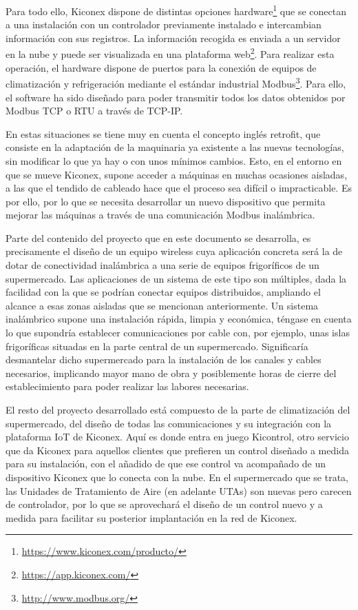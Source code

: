 Para todo ello, Kiconex dispone de distintas opciones hardware\footnote{\url{https://www.kiconex.com/producto/}} que se conectan a una instalación con un controlador previamente instalado e intercambian información con sus registros. La información recogida es enviada a un servidor en la nube y puede ser visualizada en una plataforma web\footnote{\url{https://app.kiconex.com/}}. Para realizar esta operación, el hardware dispone de puertos para la conexión de equipos de climatización y refrigeración mediante el estándar industrial Modbus\footnote{\url{http://www.modbus.org/}}. Para ello, el software ha sido diseñado para poder transmitir todos los datos obtenidos por Modbus TCP o RTU a través de TCP-IP.

En estas situaciones se tiene muy en cuenta el concepto inglés retrofit, que consiste en la adaptación de la maquinaria ya existente a las nuevas tecnologías, sin modificar lo que ya hay o con unos mínimos cambios. Esto, en el entorno en que se mueve Kiconex, supone acceder a máquinas en muchas ocasiones aisladas, a las que el tendido de cableado hace que el proceso sea difícil o impracticable. Es por ello, por lo que se necesita desarrollar un nuevo dispositivo que permita mejorar las máquinas a través de una comunicación Modbus inalámbrica.

Parte del contenido del proyecto que en este documento se desarrolla, es precisamente el diseño de un equipo wireless cuya aplicación concreta será la de dotar de conectividad inalámbrica a una serie de equipos frigoríficos de un supermercado. Las aplicaciones de un sistema de este tipo son múltiples, dada la facilidad con la que se podrían conectar equipos distribuidos, ampliando el alcance a esas zonas aisladas que se mencionan anteriormente. Un sistema inalámbrico supone una instalación rápida, limpia y económica, téngase en cuenta lo que supondría establecer comunicaciones por cable con, por ejemplo, unas islas frigoríficas situadas en la parte central de un supermercado. Significaría desmantelar dicho supermercado para la instalación de los canales y cables necesarios, implicando mayor mano de obra y posiblemente horas de cierre del establecimiento para poder realizar las labores necesarias.

El resto del proyecto desarrollado está compuesto de la parte de climatización del supermercado, del diseño de todas las comunicaciones y su integración con la plataforma IoT de Kiconex. Aquí es donde entra en juego Kicontrol, otro servicio que da Kiconex para aquellos clientes que prefieren un control diseñado a medida para su instalación, con el añadido de que ese control va acompañado de un dispositivo Kiconex que lo conecta con la nube. En el supermercado que se trata, las Unidades de Tratamiento de Aire (en adelante UTAs) son nuevas pero carecen de controlador, por lo que se aprovechará el diseño de un control nuevo y a medida para facilitar su posterior implantación en la red de Kiconex.



